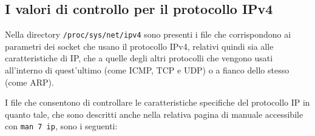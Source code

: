 \subsection{I valori di controllo per il protocollo IPv4}
\label{sec:sock_ipv4_sysctl}

Nella directory \texttt{/proc/sys/net/ipv4} sono presenti i file che
corrispondono ai parametri dei socket che usano il protocollo IPv4, relativi
quindi sia alle caratteristiche di IP, che a quelle degli altri protocolli che
vengono usati all'interno di quest'ultimo (come ICMP, TCP e UDP) o a fianco
dello stesso (come ARP).

I file che consentono di controllare le caratteristiche specifiche del
protocollo IP in quanto tale, che sono descritti anche nella relativa pagina
di manuale accessibile con \texttt{man 7 ip}, sono i seguenti:
